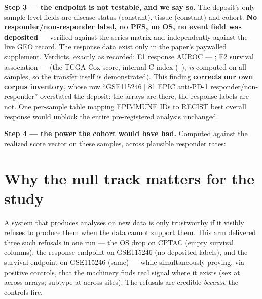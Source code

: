 \documentclass[11pt,a4paper]{article}
\begin{document}
\textbf{Step 3 --- the endpoint is not testable, and we say so.} The deposit's only
sample-level fields are disease status (constant), tissue (constant) and cohort. \textbf{No
responder/non-responder label, no PFS, no OS, no event field was deposited} --- verified
against the series matrix and independently against the live GEO record. The response data
exist only in the paper's paywalled supplement. Verdicts, exactly as recorded:
E1 response AUROC --- \textbf{\REOneStatus}; E2 survival association --- \textbf{\RETwoStatus}
(the TCGA Cox score, internal C-index \ROsCoxCindex{} (\ROsCoxLo--\ROsCoxHi), \emph{is}
computed on all \RMethN{} samples, so the transfer itself is demonstrated).
This finding \textbf{corrects our own corpus inventory}, whose row ``GSE115246 $\mid$ 81 EPIC
anti-PD-1 responder/non-responder'' overstated the deposit: the arrays are there, the response
labels are not. One per-sample table mapping EPIMMUNE IDs to RECIST best overall response
would unblock the entire pre-registered analysis unchanged.

\textbf{Step 4 --- the power the cohort would have had.} Computed against the realized score
vector on these \RMethN{} samples, across plausible responder rates:

\begin{center}
\small

\end{center}

\section{Why the null track matters for the study}

A system that produces analyses on new data is only trustworthy if it visibly refuses to
produce them when the data cannot support them. This arm delivered three such refusals in one
run --- the OS drop on CPTAC (empty survival columns), the response endpoint on GSE115246 (no
deposited labels), and the survival endpoint on GSE115246 (same) --- while simultaneously
proving, via positive controls, that the machinery finds real signal where it exists
(sex at \RSexAuroc{} across arrays; subtype at \RSubZeroFull{} across sites). The refusals are
credible \emph{because} the controls fire.
\end{document}
